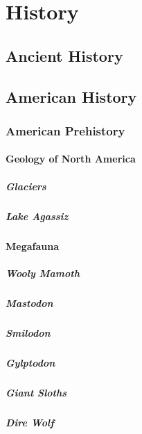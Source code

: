 \chapter{History}
	\section{Ancient History}
		
	\section{American History}
		\subsection{American Prehistory}
			\subsubsection{Geology of North America}
				\paragraph{Glaciers}
				\paragraph{Lake Agassiz}
				
				
				
			\subsubsection{Megafauna}
				\paragraph {Wooly Mamoth}
				\paragraph{Mastodon}
				\paragraph{Smilodon}
				\paragraph{Gylptodon}
				\paragraph{Giant Sloths}
				\paragraph{Dire Wolf}
		

